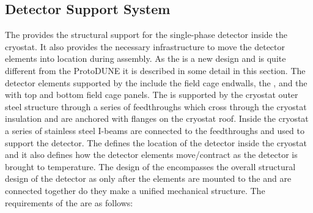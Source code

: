 \subsection{Detector Support System}

The  provides the structural support for the single-phase
detector inside the cryostat.  It also provides the necessary
infrastructure to move the detector elements into location during
assembly. As the  is a new design and is quite different
from the ProtoDUNE  it is described in some detail in this
section. The detector elements supported by the  include
the field cage endwalls, the , and the  with
top and bottom field cage panels.  The  is supported by the
cryostat outer steel structure through a series of feedthroughs which
cross through the cryostat insulation and are anchored with flanges on
the cryostat roof. Inside the cryostat a series of stainless steel
I-beams are connected to the feedthroughs and used to support the
detector. The  defines the location of the detector inside
the cryostat and it also defines how the detector elements
move/contract as the detector is brought to 
temperature. The design of the  encompasses the overall
structural design of the detector as only after the elements are
mounted to the  and are connected together do they make a
unified mechanical structure. The requirements of the  are
as follows:
